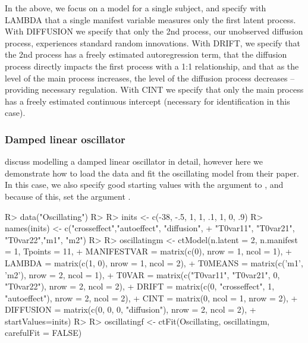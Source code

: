 \documentclass[nojss]{jss}\usepackage[]{graphicx}\usepackage[]{color}
\begin{document}
In the above, we focus on a model for a single subject, and specify with LAMBDA that a single manifest variable measures only the first latent process. With DIFFUSION we specify that only the 2nd process, our unobserved diffusion process, experiences standard random innovations. With DRIFT, we specify that the 2nd process has a freely estimated autoregression term, that the diffusion process directly impacts the first process with a 1:1 relationship, and that as the level of the main process increases, the level of the diffusion process decreases -- providing necessary regulation. With CINT we specify that only the main process has a freely estimated continuous intercept (necessary for identification in this case). 
\subsubsection{Damped linear oscillator}\nopagebreak
\citet{voelkle2013continuous} discuss modelling a damped linear oscillator in detail, however here we demonstrate how to load the data and fit the oscillating model from their paper. In this case, we also specify good starting values with the  argument to , and because of this, set the argument .

\begin{Schunk}
\begin{Sinput}
R> data("Oscillating")
R> 
R> inits <- c(-38, -.5, 1, 1, .1, 1, 0, .9)
R> names(inits) <- c("crosseffect","autoeffect", "diffusion",
+   "T0var11", "T0var21", "T0var22","m1", "m2")
R> 
R> oscillatingm <- ctModel(n.latent = 2, n.manifest = 1, Tpoints = 11, 
+   MANIFESTVAR = matrix(c(0), nrow = 1, ncol = 1), 
+   LAMBDA = matrix(c(1, 0), nrow = 1, ncol = 2),
+   T0MEANS = matrix(c('m1', 'm2'), nrow = 2, ncol = 1), 
+   T0VAR = matrix(c("T0var11", "T0var21", 0, "T0var22"), nrow = 2, ncol = 2),
+   DRIFT = matrix(c(0, "crosseffect", 1, "autoeffect"), nrow = 2, ncol = 2), 
+   CINT = matrix(0, ncol = 1, nrow = 2),
+   DIFFUSION = matrix(c(0, 0, 0, "diffusion"), nrow = 2, ncol = 2),
+   startValues=inits)
R> 
R> oscillatingf <- ctFit(Oscillating, oscillatingm, carefulFit = FALSE)
\end{Sinput}
\end{Schunk}
\end{document}
